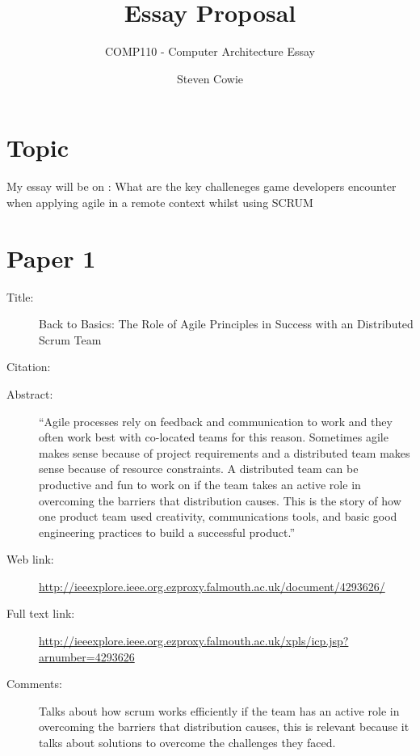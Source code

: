 \documentclass{scrartcl}
\title{Essay Proposal}
\subtitle{COMP110 - Computer Architecture Essay}
\author{Steven Cowie}
\begin{document}
\maketitle

\section*{Topic}

My essay will be on : What are the key challeneges game developers encounter when applying agile in a remote context whilst using SCRUM


\section*{Paper 1}
\begin{description}
\item[Title:] Back to Basics: The Role of Agile Principles in Success with an Distributed Scrum Team
\item[Citation:] \cite{11}
\item[Abstract:] ``Agile processes rely on feedback and communication to work and they often work best with co-located teams for this reason. Sometimes agile makes sense because of project requirements and a distributed team makes sense because of resource constraints. A distributed team can be productive and fun to work on if the team takes an active role in overcoming the barriers that distribution causes. This is the story of how one product team used creativity, communications tools, and basic good engineering practices to build a successful product.''
\item[Web link:] \url{http://ieeexplore.ieee.org.ezproxy.falmouth.ac.uk/document/4293626/}
\item[Full text link:] \url{http://ieeexplore.ieee.org.ezproxy.falmouth.ac.uk/xpls/icp.jsp?arnumber=4293626}
\item[Comments:] Talks about how scrum works efficiently if the team has an active role in overcoming the barriers that distribution causes, this is relevant because it talks about solutions to overcome the challenges they faced.
\end{description}
\end{document}
